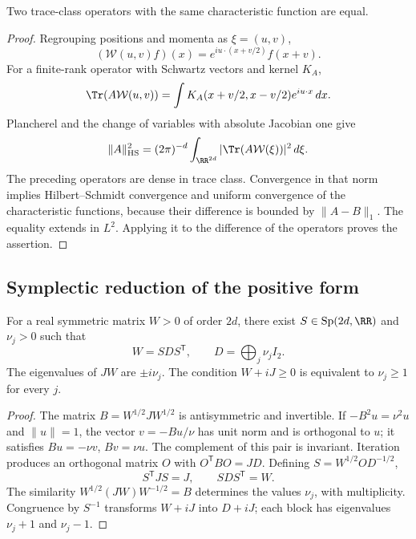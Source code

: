 \begin{lemma}
\label{app:lem:unicidad-weyl}
Two trace-class operators with the same characteristic function are equal.
\end{lemma}
\begin{proof}
Regrouping positions and momenta as \(\xi=(u,v)\),
\[
 (\mathcal W(u,v)f)(x)=e^{iu\cdot(x+v/2)}f(x+v).
\]
For a finite-rank operator with Schwartz vectors and kernel \(K_A\),
\[
 \Tr(A\mathcal W(u,v))=\int K_A(x+v/2,x-v/2)e^{iu\cdot x}\,dx.
\]
Plancherel and the change of variables with absolute Jacobian one give
\[
 \|A\|_{\rm HS}^2=(2\pi)^{-d}\int_{\RR^{2d}}
 |\Tr(A\mathcal W(\xi))|^2\,d\xi.
\]
The preceding operators are dense in trace class. Convergence in that norm implies Hilbert--Schmidt convergence and uniform convergence of the characteristic functions, because their difference is bounded by \(\|A-B\|_1\). The equality extends in \(L^2\). Applying it to the difference of the operators proves the assertion.
\end{proof}

\subsection{Symplectic reduction of the positive form}
\begin{theorem}
\label{app:thm:williamson}
For a real symmetric matrix \(W>0\) of order \(2d\), there exist \(S\in\operatorname{Sp}(2d,\RR)\) and \(\nu_j>0\) such that
\[
 W=SDS^{\mathsf T},\qquad D=\bigoplus_j\nu_jI_2.
\]
The eigenvalues of \(JW\) are \(\pm i\nu_j\). The condition \(W+iJ\geq0\) is equivalent to \(\nu_j\geq1\) for every \(j\).
\end{theorem}
\begin{proof}
The matrix \(B=W^{1/2}JW^{1/2}\) is antisymmetric and invertible. If \(-B^2u=\nu^2u\) and \(\|u\|=1\), the vector \(v=-Bu/\nu\) has unit norm and is orthogonal to \(u\); it satisfies \(Bu=-\nu v\), \(Bv=\nu u\). The complement of this pair is invariant. Iteration produces an orthogonal matrix \(O\) with \(O^{\mathsf T}BO=JD\). Defining \(S=W^{1/2}OD^{-1/2}\),
\[
 S^{\mathsf T}JS=J,\qquad SDS^{\mathsf T}=W.
\]
The similarity \(W^{1/2}(JW)W^{-1/2}=B\) determines the values \(\nu_j\), with multiplicity. Congruence by \(S^{-1}\) transforms \(W+iJ\) into \(D+iJ\); each block has eigenvalues \(\nu_j+1\) and \(\nu_j-1\).
\end{proof}

